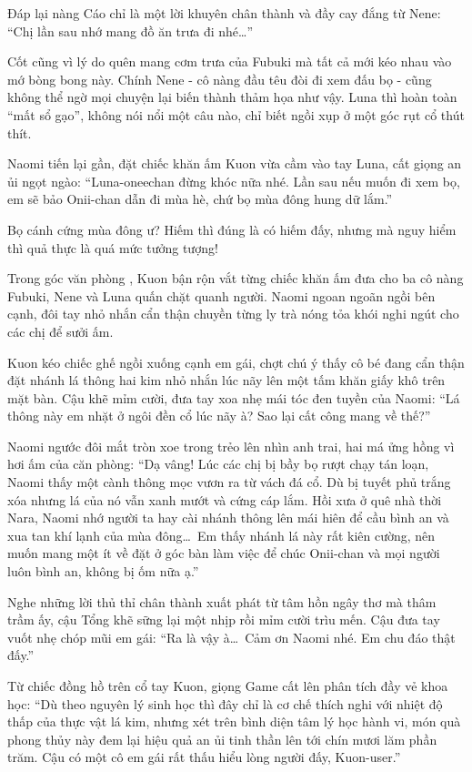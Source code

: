 \documentclass[../main.tex]{subfiles}
\begin{document}
Đáp lại nàng Cáo chỉ là một lời khuyên chân thành và đầy cay đắng từ Nene: ``Chị lần sau nhớ mang đồ ăn trưa đi nhé\dots''

Cốt cũng vì lý do quên mang cơm trưa của Fubuki mà tất cả mới kéo nhau vào mớ bòng bong này. Chính Nene - cô nàng đầu têu đòi đi xem đấu bọ - cũng không thể ngờ mọi chuyện lại biến thành thảm họa như vậy. Luna thì hoàn toàn ``mất sổ gạo'', không nói nổi một câu nào, chỉ biết ngồi xụp ở một góc rụt cổ thút thít.

Naomi tiến lại gần, đặt chiếc khăn ấm Kuon vừa cầm vào tay Luna, cất giọng an ủi ngọt ngào: ``Luna-oneechan đừng khóc nữa nhé. Lần sau nếu muốn đi xem bọ, em sẽ bảo Onii-chan dẫn đi mùa hè, chứ bọ mùa đông hung dữ lắm.''

Bọ cánh cứng mùa đông ư? Hiếm thì đúng là có hiếm đấy, nhưng mà nguy hiểm thì quả thực là quá mức tưởng tượng!

\omk

Trong góc văn phòng \hll, Kuon bận rộn vắt từng chiếc khăn ấm đưa cho ba cô nàng Fubuki, Nene và Luna quấn chặt quanh người. Naomi ngoan ngoãn ngồi bên cạnh, đôi tay nhỏ nhắn cẩn thận chuyền từng ly trà nóng tỏa khói nghi ngút cho các chị để sưởi ấm.

Kuon kéo chiếc ghế ngồi xuống cạnh em gái, chợt chú ý thấy cô bé đang cẩn thận đặt nhánh lá thông hai kim nhỏ nhắn lúc nãy lên một tấm khăn giấy khô trên mặt bàn. Cậu khẽ mỉm cười, đưa tay xoa nhẹ mái tóc đen tuyền của Naomi: ``Lá thông này em nhặt ở ngôi đền cổ lúc nãy à? Sao lại cất công mang về thế?''

Naomi ngước đôi mắt tròn xoe trong trẻo lên nhìn anh trai, hai má ửng hồng vì hơi ấm của căn phòng: ``Dạ vâng! Lúc các chị bị bầy bọ rượt chạy tán loạn, Naomi thấy một cành thông mọc vươn ra từ vách đá cổ. Dù bị tuyết phủ trắng xóa nhưng lá của nó vẫn xanh mướt và cứng cáp lắm. Hồi xưa ở quê nhà thời Nara, Naomi nhớ người ta hay cài nhánh thông lên mái hiên để cầu bình an và xua tan khí lạnh của mùa đông\dots\ Em thấy nhánh lá này rất kiên cường, nên muốn mang một ít về đặt ở góc bàn làm việc để chúc Onii-chan và mọi người luôn bình an, không bị ốm nữa ạ.''

Nghe những lời thủ thỉ chân thành xuất phát từ tâm hồn ngây thơ mà thâm trầm ấy, cậu Tổng khẽ sững lại một nhịp rồi mỉm cười trìu mến. Cậu đưa tay vuốt nhẹ chóp mũi em gái: ``Ra là vậy à\dots\ Cảm ơn Naomi nhé. Em chu đáo thật đấy.''

Từ chiếc đồng hồ trên cổ tay Kuon, giọng Game cất lên phân tích đầy vẻ khoa học: ``Dù theo nguyên lý sinh học thì đây chỉ là cơ chế thích nghi với nhiệt độ thấp của thực vật lá kim, nhưng xét trên bình diện tâm lý học hành vi, món quà phong thủy này đem lại hiệu quả an ủi tinh thần lên tới chín mươi lăm phần trăm. Cậu có một cô em gái rất thấu hiểu lòng người đấy, Kuon-user.''
\end{document}
